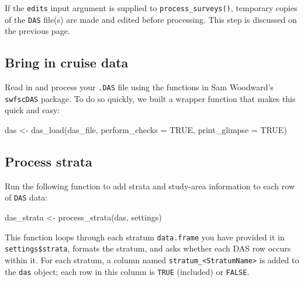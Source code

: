 \documentclass[
]{book}
\newenvironment{Shaded}{\begin{snugshade}}{\end{snugshade}}
\newcommand{\AttributeTok}[1]{\textcolor[rgb]{0.77,0.63,0.00}{#1}}
\newcommand{\ConstantTok}[1]{\textcolor[rgb]{0.00,0.00,0.00}{#1}}
\newcommand{\FunctionTok}[1]{\textcolor[rgb]{0.00,0.00,0.00}{#1}}
\newcommand{\NormalTok}[1]{#1}
\newcommand{\OtherTok}[1]{\textcolor[rgb]{0.56,0.35,0.01}{#1}}
\begin{document}
If the \texttt{edits} input argument is supplied to \texttt{process\_surveys()}, temporary copies of the \texttt{DAS} file(s) are made and edited before processing. This step is discussed on the previous page.

\hypertarget{bring-in-cruise-data}{%
\subsection*{Bring in cruise data}\label{bring-in-cruise-data}}

Read in and process your \texttt{.DAS} file using the functions in Sam Woodward's \texttt{swfscDAS} package. To do so quickly, we built a wrapper function that makes this quick and easy:

\begin{Shaded}
\begin{Highlighting}[]
\NormalTok{das }\OtherTok{\textless{}{-}} \FunctionTok{das\_load}\NormalTok{(das\_file, }
                \AttributeTok{perform\_checks =} \ConstantTok{TRUE}\NormalTok{,}
                \AttributeTok{print\_glimpse =} \ConstantTok{TRUE}\NormalTok{)}
\end{Highlighting}
\end{Shaded}

\hypertarget{process-strata}{%
\subsection*{Process strata}\label{process-strata}}

Run the following function to add strata and study-area information to each row of \texttt{DAS} data:

\begin{Shaded}
\begin{Highlighting}[]
\NormalTok{das\_strata }\OtherTok{\textless{}{-}} \FunctionTok{process\_strata}\NormalTok{(das, settings)}
\end{Highlighting}
\end{Shaded}

This function loops through each stratum \texttt{data.frame} you have provided it in \texttt{settings\$strata}, formats the stratum, and asks whether each DAS row occurs within it. For each stratum, a column named \texttt{stratum\_\textless{}StratumName\textgreater{}} is added to the \texttt{das} object; each row in this column is \texttt{TRUE} (included) or \texttt{FALSE}.
\end{document}
